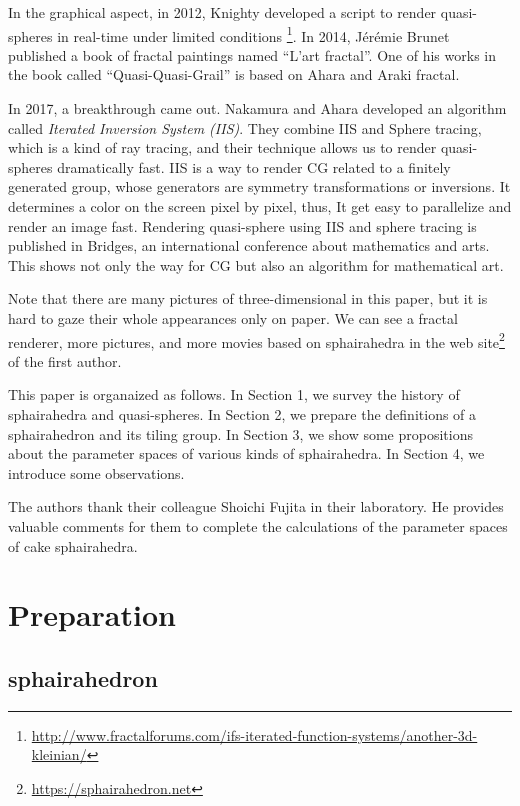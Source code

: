 \documentclass[suppldata, dvipdfmx]{interact}
\theoremstyle{plain}%
\theoremstyle{definition}
\theoremstyle{remark}
\theoremstyle{problemstyle}
\begin{document}
In the graphical aspect, in 2012, Knighty developed a script to render
quasi-spheres in real-time under limited conditions
\footnote{\url{http://www.fractalforums.com/ifs-iterated-function-systems/another-3d-kleinian/}}.
In 2014, J\'er\'emie Brunet published a book of
fractal paintings named ``L'art fractal''. One of his works in the book called
``Quasi-Quasi-Grail'' is based on Ahara and Araki fractal.

In 2017, a breakthrough came out. 
Nakamura and Ahara developed an algorithm called
\textit{Iterated Inversion System (IIS)}\cite{bridges2016}\cite{bridges2017}.
They combine IIS and Sphere tracing, which is a kind of ray tracing, 
and their technique allows us to render quasi-spheres dramatically fast.
IIS is a way to render CG related to a finitely generated group, whose
generators are symmetry transformations or inversions.
It determines a color on the screen pixel by pixel, thus, It get easy to parallelize and render an image fast. 
Rendering quasi-sphere using IIS and sphere tracing is published in
Bridges\cite{bridges2018}, an international conference about mathematics
and arts.
This shows not only the way for CG but also an algorithm for mathematical art.

Note that there are many pictures of three-dimensional in this paper, 
but it is hard to gaze their whole appearances only on paper. We can see a fractal renderer, more pictures, and more movies based on sphairahedra in
the web site\footnote{\url{https://sphairahedron.net}} of the first author.

This paper is organaized as follows.  
In Section 1, we survey the history of sphairahedra and quasi-spheres.
In Section 2, we prepare the definitions of a sphairahedron and its tiling group.
In Section 3, we show some propositions about the parameter spaces of various kinds of sphairahedra.
In Section 4, we introduce some observations. 

The authors thank their colleague Shoichi Fujita in their laboratory.
He provides valuable comments for them  to complete the calculations of 
the parameter spaces of cake sphairahedra.


\section{Preparation}

\subsection{sphairahedron}
\end{document}
